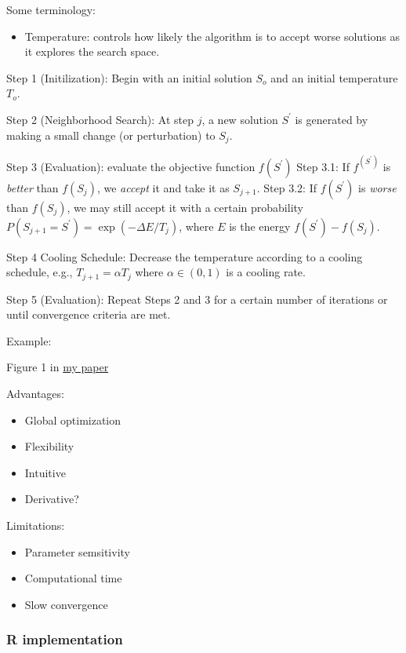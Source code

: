 \documentclass[
  letterpaper,
  DIV=11,
  numbers=noendperiod]{scrreprt}
\providecommand{\tightlist}{%
  \setlength{\itemsep}{0pt}\setlength{\parskip}{0pt}}
\begin{document}
Some terminology:

\begin{itemize}
\tightlist
\item
  Temperature: controls how likely the algorithm is to accept worse
  solutions as it explores the search space.
\end{itemize}

Step 1 (Initilization): Begin with an initial solution \(S_ο\) and an
initial temperature \(T_ο\).

Step 2 (Neighborhood Search): At step \(j\), a new solution \(S^\prime\)
is generated by making a small change (or perturbation) to \(S_j\).

Step 3 (Evaluation): evaluate the objective function \(f(S^\prime)\)
Step 3.1: If \(f^(S^\prime)\) is \emph{better} than \(f(S_j)\), we
\emph{accept} it and take it as \(S_{j+1}\). Step 3.2: If
\(f(S^\prime)\) is \emph{worse} than \(f(S_j)\), we may still accept it
with a certain probability \(P(S_{j+1}=S^\prime)=\exp(-\Delta E/T_j)\),
where \(E\) is the energy \(f(S^\prime)-f(S_j)\).

Step 4 Cooling Schedule: Decrease the temperature according to a cooling
schedule, e.g., \(T_{j+1} = \alpha T_j\) where \(\alpha \in (0,1)\) is a
cooling rate.

Step 5 (Evaluation): Repeat Steps 2 and 3 for a certain number of
iterations or until convergence criteria are met.

Example:

Figure 1 in \href{https://arxiv.org/pdf/2405.02983}{my paper}

Advantages:

\begin{itemize}
\item
  Global optimization
\item
  Flexibility
\item
  Intuitive
\item
  Derivative?
\end{itemize}

Limitations:

\begin{itemize}
\item
  Parameter semsitivity
\item
  Computational time
\item
  Slow convergence
\end{itemize}

\subsubsection{R implementation}\label{r-implementation}
\end{document}
